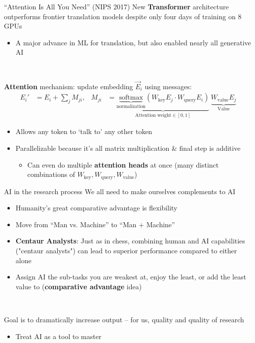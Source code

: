 \documentclass[xcolor=table, aspectratio=169]{beamer}
\newcommand{\alertbf}[1]{\alert{\textbf{#1}}}
\begin{document}
\begin{frame}{``Attention Is All You Need'' (NIPS 2017)}
New \alertbf{Transformer} architecture outperforms frontier translation models despite only four days of training on 8 GPUs
\begin{itemize}
    \item A major advance in ML for translation, but also enabled nearly all generative AI
\end{itemize}

~

\alertbf{Attention} mechanism: update embedding $\overrightarrow{E}_i$ using messages:
\begin{align*}
    E_i'&=E_i+\sum_{j} M_{ji}, & M_{ji} &= \underbrace{\underbrace{\text{softmax}}_{\text{normalization}}\left(W_\text{key} E_j \cdot W_\text{query} E_i\right)}_{\text{Attention weight} \in [0,1] } \: \underbrace{W_\text{value} E_j}_\text{Value}
\end{align*}

\begin{itemize}
    \item Allows any token to `talk to' any other token
    \item Parallelizable because it's all matrix multiplication \& final step is additive
    \begin{itemize}
        \item Can even do multiple \alertbf{attention heads} at once (many distinct combinations of $W_\text{key}, W_\text{query}, W_\text{value}$)
    \end{itemize}
\end{itemize}
\end{frame}

\begin{frame}{AI in the research process}
We all need to make ourselves complements to AI
    \begin{itemize}
        \item Humanity's great comparative advantage is flexibility
        \item Move from ``Man vs. Machine'' to ``Man + Machine''
        \item \alertbf{Centaur Analysts}: Just as in chess, combining human and AI capabilities ("centaur analysts") can lead to superior performance compared to either alone
        \item Assign AI the sub-tasks you are weakest at, enjoy the least, or add the least value to (\alertbf{comparative advantage} idea)
    \end{itemize}

~

Goal is to dramatically increase output -- for us, quality and quality of research
\begin{itemize}
    \item Treat AI as a tool to master
\end{itemize}
\end{frame}
\end{document}
